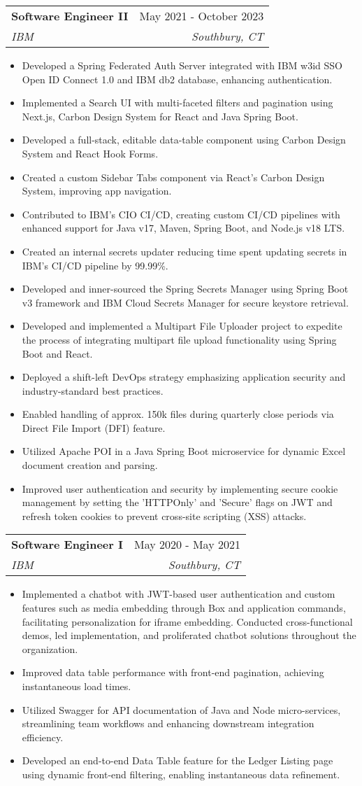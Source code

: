 \documentclass[letterpaper,11pt]{article}
\makeatletter
\newcommand{\resumeItem}[1]{
  \item[-] \small{
    {#1 \vspace{-2pt}}
  }
}
\newcommand{\resumeSubheading}[4]{
  \vspace{-2pt}\item
    \begin{tabular*}{0.97\textwidth}[t]{l@{\extracolsep{\fill}}r}
      \textbf{#1} & #2 \\
      \textit{\small#3} & \textit{\small #4} \\
    \end{tabular*}\vspace{-7pt}
}
\newcommand{\resumeItemListStart}{\begin{itemize}[rightmargin=\dimexpr\linewidth-17.25cm-\leftmargin\relax]}
\newcommand{\resumeItemListEnd}{\end{itemize}\vspace{-5pt}}
\makeatother
\begin{document}
\resumeSubheading
{Software Engineer II}{May 2021 - October 2023}
{IBM}{Southbury, CT}
\resumeItemListStart
\resumeItem{Developed a Spring Federated Auth Server integrated with IBM w3id SSO Open ID Connect 1.0 and IBM db2 database, enhancing authentication.}
\resumeItem{Implemented a Search UI with multi-faceted filters and pagination using Next.js, Carbon Design System for React and Java Spring Boot.}
\resumeItem{Developed a full-stack, editable data-table component using Carbon Design System and React Hook Forms.}
\resumeItem{Created a custom Sidebar Tabs component via React's Carbon Design System, improving app navigation.}
\resumeItem{Contributed to IBM's CIO CI/CD, creating custom CI/CD pipelines with enhanced support for Java v17, Maven, Spring Boot, and Node.js v18 LTS.}
\resumeItem{Created an internal secrets updater reducing time spent updating secrets in IBM's CI/CD pipeline by 99.99\%.}
\resumeItem{Developed and inner-sourced the Spring Secrets Manager using Spring Boot v3 framework and IBM Cloud Secrets Manager for secure keystore retrieval.}
\resumeItem{Developed and implemented a Multipart File Uploader project to expedite the process of integrating multipart file upload functionality using Spring Boot and React.}
\resumeItem{Deployed a shift-left DevOps strategy emphasizing application security and industry-standard best practices.}
\resumeItem{Enabled handling of approx. 150k files during quarterly close periods via Direct File Import (DFI) feature.}
\resumeItem{Utilized Apache POI in a Java Spring Boot microservice for dynamic Excel document creation and parsing.}
\resumeItem{Improved user authentication and security by implementing secure cookie management by setting the 'HTTPOnly' and 'Secure' flags on JWT and refresh token cookies to prevent cross-site scripting (XSS) attacks.}
\resumeItemListEnd

\resumeSubheading
{Software Engineer I}{May 2020 - May 2021}
{IBM}{Southbury, CT}
\resumeItemListStart
\resumeItem{Implemented a chatbot with JWT-based user authentication and custom features such as media embedding through Box and application commands, facilitating personalization for iframe embedding. Conducted cross-functional demos, led implementation, and proliferated chatbot solutions throughout the organization.}
\resumeItem{Improved data table performance with front-end pagination, achieving instantaneous load times.}
\resumeItem{Utilized Swagger for API documentation of Java and Node micro-services, streamlining team workflows and enhancing downstream integration efficiency.}
\resumeItem{Developed an end-to-end Data Table feature for the Ledger Listing page using dynamic front-end filtering, enabling instantaneous data refinement.}
\resumeItemListEnd
\end{document}
